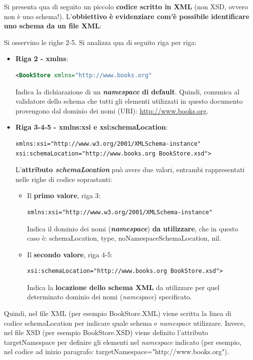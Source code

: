 \documentclass[a4paper]{article}
\begin{document}
	\noindent
	Si presenta qua di seguito un piccolo \textbf{codice scritto in XML} (non XSD, ovvero non è uno schema!). L'\textbf{obbiettivo è evidenziare com'è possibile identificare uno schema da un file XML}:
	
	Si osservino le righe 2-5. Si analizza qua di seguito riga per riga:
	\begin{itemize}
		\item \textcolor{Red3}{\textbf{Riga 2 - \textsf{xmlns}}}:
		\begin{lstlisting}[language=XML]
<BookStore xmlns="http://www.books.org"\end{lstlisting}
		Indica la dichiarazione di un \textbf{\emph{namespace} di default}. Quindi, comunica al validatore dello schema che tutti gli elementi utilizzati in questo documento provengono dal dominio dei nomi (URI): \url{http://www.books.org}.
		
		\item \textcolor{Red3}{\textbf{Riga 3-4-5 - \textsf{xmlns:xsi} e \textsf{xsi:schemaLocation}}}:
		\begin{lstlisting}[language=XML]
xmlns:xsi="http://www.w3.org/2001/XMLSchema-instance"
xsi:schemaLocation="http://www.books.org BookStore.xsd">\end{lstlisting}
		L'\textbf{attributo \emph{schemaLocation}} può avere due valori, entrambi rappresentati nelle righe di codice soprastanti:
		\begin{itemize}
			\item Il \textbf{primo valore}, riga 3:
			\begin{lstlisting}[language=XML]
xmlns:xsi="http://www.w3.org/2001/XMLSchema-instance"\end{lstlisting}
			Indica il dominio dei nomi (\textbf{\emph{namespace}}) \textbf{da utilizzare}, che in questo caso è: \textsf{schemaLocation, type, noNamespaceSchemaLocation, nil}.
			
			\item Il \textbf{secondo valore}, riga 4-5:
			\begin{lstlisting}[language=XML]
xsi:schemaLocation="http://www.books.org BookStore.xsd">\end{lstlisting}
			Indica la \textbf{locazione dello schema XML} da utilizzare per quel determinato dominio dei nomi (\emph{namespace}) specificato.
		\end{itemize}
	\end{itemize}
	Quindi, nel file XML (per esempio BookStore.XML) viene scritta la linea di codice \textsf{schemaLocation} per indicare quale schema e \emph{namespace} utilizzare. Invece, nel file XSD (per esempio BookStore.XSD) viene definito l'attributo \textsf{targetNamespace} per definire gli elementi nel \emph{namespace} indicato (per esempio, nel codice ad inizio paragrafo: \textsf{targetNamespace="http://www.books.org"}).\newline
	
\end{document}
